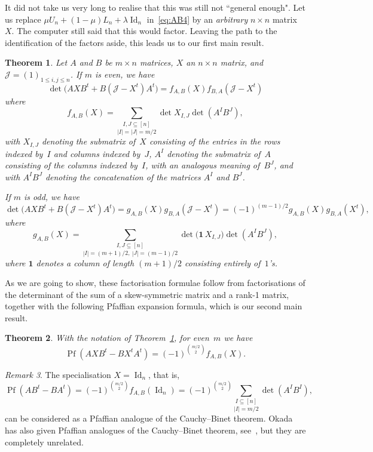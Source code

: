 \documentclass[12pt,reqno]{amsart}
\numberwithin{equation}{section}
\newtheorem{theorem}{Theorem}
\theoremstyle{definition}
\theoremstyle{remark}
\newtheorem{remark}[theorem]{Remark}
\def\Pf{\operatorname{Pf}}
\def\Id{\operatorname{Id}}
\def\la{\lambda}
\def\J{\mathcal J}
\begin{document}
It did not take us very long to realise that this was still not
``general enough". Let us replace $\mu U_n+(1-\mu)L_n+\la\Id_n$
in~\eqref{eq:AB4}
by an {\it arbitrary} $n\times n$ matrix~$X$. The computer still
said that this would factor. Leaving the path to the
identification of
the factors aside, this leads us to our first main result.

\begin{theorem} \label{thm:main1}
Let $A$ and $B$ be $m\times n$ matrices,
$X$ an $n\times n$ matrix, and
$\J =(1)_{1\le i,j\le n}$. If $m$ is even, we have
\begin{equation} \label{eq:1}
\det\bigl(AXB^t+B(\J -X^t)A^t\bigr)
=f_{A,B}(X)f_{B,A}(\J -X^t)
\end{equation}
where
$$
f_{A,B}(X)=\underset {|I|=|J|=m/2}{\sum_{I,J\subseteq[n]}}
\det X_{I,J} \det(A^IB^J),
$$
with $X_{I,J}$ denoting the submatrix of~$X$ consisting of the entries
in the 
rows indexed by~$I$ and columns indexed by~$J$, $A^I$ denoting
the submatrix of~$A$ consisting of the columns indexed by~$I$,
with an analogous meaning of~$B^J$, and with $A^IB^J$ denoting
the concatenation of the matrices $A^I$ and $B^J$.

If $m$ is odd, we have
\begin{equation} \label{eq:1o}
\det\bigl(AXB^t+B(\J -X^t)A^t\bigr)
=g_{A,B}(X)g_{B,A}(\J -X^t)
=(-1)^{(m-1)/2}g_{A,B}(X)g_{B,A}(X^t),
\end{equation}
where
$$
g_{A,B}(X)=\underset {|I|=(m+1)/2,\ |J|=(m-1)/2}{\sum_{I,J\subseteq[n]}}
\det\bigl(\mathbf1 \, X_{I,J}\bigr) \det(A^IB^J),
$$
where $\mathbf 1$ denotes a column of length $(m+1)/2$ consisting
entirely of~$1$'s.
\end{theorem}

As we are going to show, these factorisation formulae follow from
factorisations of the determinant of the sum of a skew-symmetric
matrix and a rank-1 matrix, together with the following Pfaffian
expansion formula, which is our second main result.

\begin{theorem} \label{thm:main2}
With the notation of Theorem~\ref{thm:main1}, for even~$m$ we have
\begin{equation} \label{eq:4} 
\Pf (AXB^t-BX^tA^t)
=(-1)^{\binom {m/2}2}f_{A,B}(X).
\end{equation}
\end{theorem}

\begin{remark}
The specialisation $X=\Id _n$, that is,
$$
\Pf (AB^t-BA^t)
=(-1)^{\binom {m/2}2}f_{A,B}(\Id _n)
=(-1)^{\binom {m/2}2}
\underset{ |I|=m/2}{\sum_{I\subseteq[n]}}
\det(A^IB^I),
$$
can be considered as a Pfaffian analogue of the Cauchy--Binet
theorem. Okada has also given Pfaffian analogues of the Cauchy--Binet theorem,
see~\cite[Sec.~3]{OkadAB},
but they are completely unrelated.
\end{remark}
\end{document}
